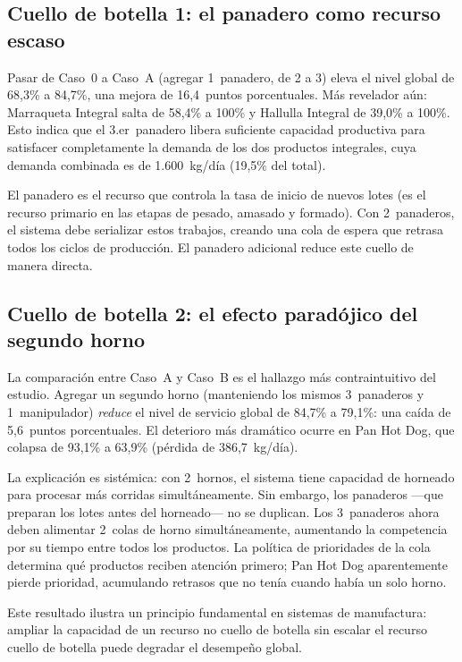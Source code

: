 \documentclass[12pt]{article}
\begin{document}
\subsection{Cuello de botella 1: el panadero como recurso escaso}

Pasar de Caso~0 a Caso~A (agregar 1~panadero, de 2 a 3) eleva el nivel global de 68,3\% a 84,7\%, una mejora de 16,4~puntos porcentuales. Más revelador aún: Marraqueta Integral salta de 58,4\% a 100\% y Hallulla Integral de 39,0\% a 100\%. Esto indica que el 3.er~panadero libera suficiente capacidad productiva para satisfacer completamente la demanda de los dos productos integrales, cuya demanda combinada es de 1.600~kg/día (19,5\% del total).

El panadero es el recurso que controla la tasa de inicio de nuevos lotes (es el recurso primario en las etapas de pesado, amasado y formado). Con 2~panaderos, el sistema debe serializar estos trabajos, creando una cola de espera que retrasa todos los ciclos de producción. El panadero adicional reduce este cuello de manera directa.

\subsection{Cuello de botella 2: el efecto paradójico del segundo horno}

La comparación entre Caso~A y Caso~B es el hallazgo más contraintuitivo del estudio. Agregar un segundo horno (manteniendo los mismos 3~panaderos y 1~manipulador) \emph{reduce} el nivel de servicio global de 84,7\% a 79,1\%: una caída de 5,6~puntos porcentuales. El deterioro más dramático ocurre en Pan Hot Dog, que colapsa de 93,1\% a 63,9\% (pérdida de 386,7~kg/día).

La explicación es sistémica: con 2~hornos, el sistema tiene capacidad de horneado para procesar más corridas simultáneamente. Sin embargo, los panaderos ---que preparan los lotes antes del horneado--- no se duplican. Los 3~panaderos ahora deben alimentar 2~colas de horno simultáneamente, aumentando la competencia por su tiempo entre todos los productos. La política de prioridades de la cola determina qué productos reciben atención primero; Pan Hot Dog aparentemente pierde prioridad, acumulando retrasos que no tenía cuando había un solo horno.

Este resultado ilustra un principio fundamental en sistemas de manufactura: ampliar la capacidad de un recurso no cuello de botella sin escalar el recurso cuello de botella puede degradar el desempeño global.
\end{document}
